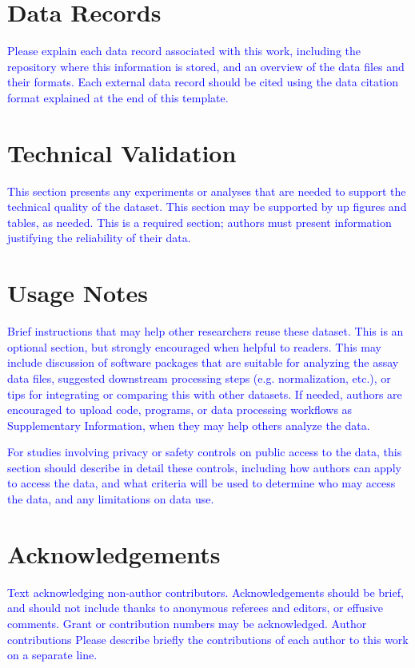 \documentclass[english,11pt]{article}
\begin{document}
\section*{Data Records }

\textcolor{blue}{Please explain each data record associated with this work, including
the repository where this information is stored, and an overview of
the data files and their formats. Each external data record should
be cited using the data citation format explained at the end of this
template.}


\section*{Technical Validation }

\textcolor{blue}{This section presents any experiments or analyses that are needed
to support the technical quality of the dataset. This section may
be supported by up figures and tables, as needed. This is a required
section; authors must present information justifying the reliability
of their data.}


\section*{Usage Notes}

\textcolor{blue}{Brief instructions that may help other researchers reuse these dataset.
This is an optional section, but strongly encouraged when helpful
to readers. This may include discussion of software packages that
are suitable for analyzing the assay data files, suggested downstream
processing steps (e.g. normalization, etc.), or tips for integrating
or comparing this with other datasets. If needed, authors are encouraged
to upload code, programs, or data processing workflows as Supplementary
Information, when they may help others analyze the data.}

\textcolor{blue}{For studies involving privacy or safety controls on public access
to the data, this section should describe in detail these controls,
including how authors can apply to access the data, and what criteria
will be used to determine who may access the data, and any limitations
on data use. }


\section*{Acknowledgements }

\textcolor{blue}{Text acknowledging non-author contributors. Acknowledgements should
be brief, and should not include thanks to anonymous referees and
editors, or effusive comments. Grant or contribution numbers may be
acknowledged. Author contributions Please describe briefly the contributions
of each author to this work on a separate line. }
\end{document}
